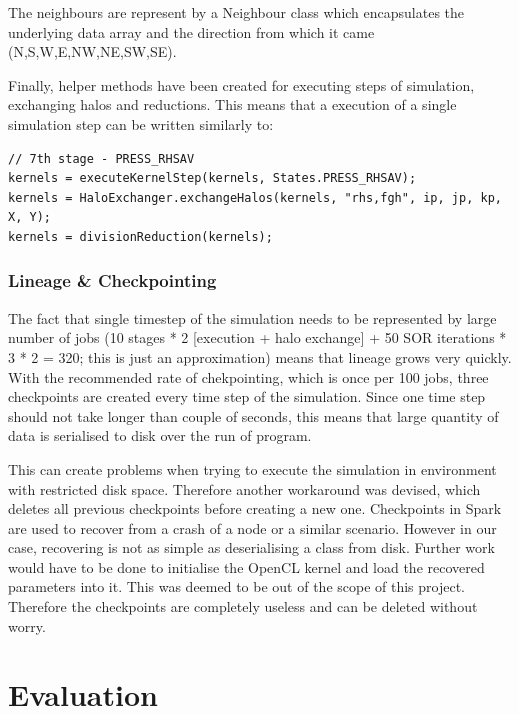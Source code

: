 \documentclass{l4proj}
\begin{document}
The neighbours are represent by a Neighbour class which encapsulates the underlying data
array and the direction from which it came (N,S,W,E,NW,NE,SW,SE).

Finally, helper methods have been created for executing steps of simulation, exchanging halos
and reductions. This means that a execution of a single simulation step can be written similarly to:

\begin{lstlisting}
// 7th stage - PRESS_RHSAV
kernels = executeKernelStep(kernels, States.PRESS_RHSAV);
kernels = HaloExchanger.exchangeHalos(kernels, "rhs,fgh", ip, jp, kp, X, Y);
kernels = divisionReduction(kernels);
\end{lstlisting}

\subsection{Lineage \& Checkpointing}
\label{chap:lineage_n_checkpointing}

The fact that single timestep of the simulation needs to be represented by
large number of jobs (10 stages * 2 [execution + halo exchange] + 50 SOR iterations * 3
* 2 = 320; this is just an approximation) means that lineage grows very quickly.
With the recommended rate of chekpointing, which is once per 100 jobs, three 
checkpoints are created every time step of the simulation. Since one time step
should not take longer than couple of seconds, this means that large quantity 
of data is serialised to disk over the run of program.

This can create problems when trying to execute the simulation in environment
with restricted disk space. Therefore another workaround was devised, which deletes
all previous checkpoints before creating a new one. Checkpoints in Spark are used
to recover from a crash of a node or a similar scenario. However in our case,
recovering is not as simple as deserialising a class from disk. Further work
would have to be done to initialise the OpenCL kernel and load the recovered  
parameters into it. This was deemed to be out of the scope of this project.
Therefore the checkpoints are completely useless and can be deleted without worry.

\chapter{Evaluation}
\label{chap:eval}
\end{document}
